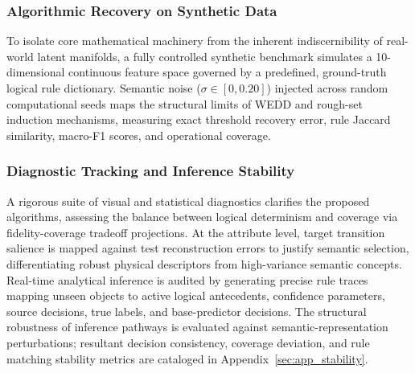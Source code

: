 \documentclass[make,article,submit,pdftex,moreauthors]{Definitions/mdpi}
\begin{document}
\subsubsection{Algorithmic Recovery on Synthetic Data}
\label{subsubsec:algorithmic_recovery}

To isolate core mathematical machinery from the inherent indiscernibility of real-world latent manifolds, a fully controlled synthetic benchmark simulates a 10-dimensional continuous feature space governed by a predefined, ground-truth logical rule dictionary. Semantic noise ($\sigma \in [0, 0.20]$) injected across random computational seeds maps the structural limits of WEDD and rough-set induction mechanisms, measuring exact threshold recovery error, rule Jaccard similarity, macro-F1 scores, and operational coverage.

\subsubsection{Diagnostic Tracking and Inference Stability}
\label{subsubsec:diagnostic_tracking}

A rigorous suite of visual and statistical diagnostics clarifies the proposed algorithms, assessing the balance between logical determinism and coverage via fidelity-coverage tradeoff projections. At the attribute level, target transition salience is mapped against test reconstruction errors to justify semantic selection, differentiating robust physical descriptors from high-variance semantic concepts. Real-time analytical inference is audited by generating precise rule traces mapping unseen objects to active logical antecedents, confidence parameters, source decisions, true labels, and base-predictor decisions. The structural robustness of inference pathways is evaluated against semantic-representation perturbations; resultant decision consistency, coverage deviation, and rule matching stability metrics are cataloged in Appendix~\ref{sec:app_stability}.


\end{document}
